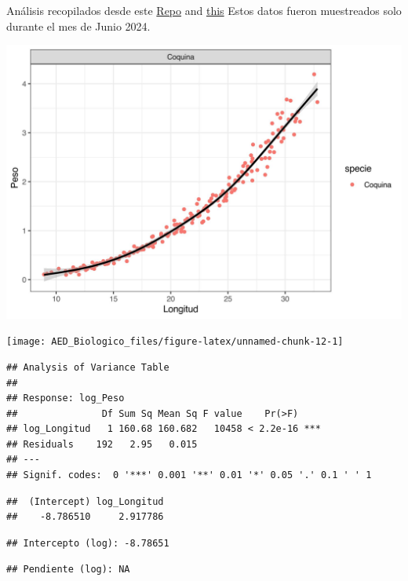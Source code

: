 \documentclass[
]{article}
\begin{document}
Análisis recopilados desde este \href{https://rpubs.com/jdmaestre/366409}{Repo} and \href{http://derekogle.com/fishR/examples/oldFishRVignettes/LengthWeight.pdf}{this}
Estos datos fueron muestreados solo durante el mes de Junio 2024.

\begin{center}\includegraphics{AED_Biologico_files/figure-latex/unnamed-chunk-11-1} \end{center}

\begin{center}\texttt{[image: AED\_Biologico\_files/figure-latex/unnamed-chunk-12-1]} \end{center}

\begin{verbatim}
## Analysis of Variance Table
## 
## Response: log_Peso
##               Df Sum Sq Mean Sq F value    Pr(>F)    
## log_Longitud   1 160.68 160.682   10458 < 2.2e-16 ***
## Residuals    192   2.95   0.015                      
## ---
## Signif. codes:  0 '***' 0.001 '**' 0.01 '*' 0.05 '.' 0.1 ' ' 1
\end{verbatim}

\begin{verbatim}
##  (Intercept) log_Longitud 
##    -8.786510     2.917786
\end{verbatim}

\begin{verbatim}
## Intercepto (log): -8.78651
\end{verbatim}

\begin{verbatim}
## Pendiente (log): NA
\end{verbatim}
\end{document}
